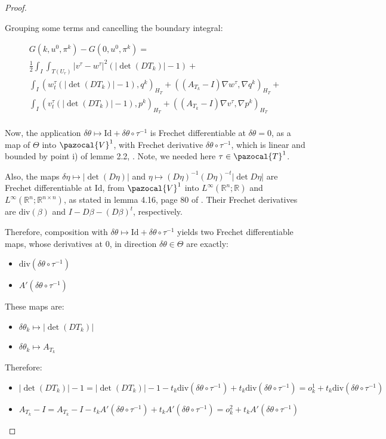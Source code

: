 \documentclass[english,a4paper,12pt,oneside]{scrbook}
\theoremstyle{break}
\newenvironment{mproof}[1][\proofname]{%
  \begin{proof}[#1]$ $\par\nobreak\ignorespaces
}{%
  \end{proof}
}
\renewcommand*{\proofname}{Proof}
\theoremstyle{remark}
\newcommand{\mR}{\mathbb{R}}
\newcommand{\cV}{\pazocal{V}}
\newcommand{\cT}{\pazocal{T}}
\newcommand{\id}{\text{Id}}
\newcommand{\te}{\theta}
\newcommand{\Te}{\Theta}
\newcommand{\dive}{\text{div}}
\begin{document}
\begin{mproof}
Grouping some terms and cancelling the boundary integral:

\begin{align*}
G(k,u^0,\pi^k)-G(0,u^0,\pi^k) =\\
\frac{1}{2}\int_I \int_{T(U_r)}|v^\tau-w^\tau|^2(|\det(DT_k)|-1)+\\
\int_I ( w_t^\tau (|\det(DT_k)| -1), q^k)_{H_T}+ ((A_{T_k}-I)\nabla w^\tau, \nabla q^k)_{H_T}+\\
\int_I (v_t^\tau (|\det(DT_k)|-1),p^k )_{H_T} + ((A_{T_k}-I) \nabla v^\tau, \nabla p^k)_{H_T} \\
\end{align*}

Now, the application $\delta \te \mapsto \id +\delta \te \circ \tau^{-1}$ is Frechet differentiable at $\delta \te =0$, as a map of $\Te$ into $\cV^1$, with Frechet derivative $\delta \te \circ \tau^{-1}$, which is linear and bounded by point i) of lemme 2.2, \cite{murat}. Note, we needed here $\tau \in \cT^1$.

Also, the maps $\delta \eta \mapsto |\det(D\eta)|$ and $\eta\mapsto (D\eta)^{-1}(D\eta)^{-t}|\det D\eta|$ are Frechet differentiable at $\id$, from $\cV^1$ into $L^\infty(\mR^n;\mR)$ and $L^\infty(\mR^n;\mR^{n\times n})$, as stated in lemma 4.16, page 80 of \cite{lindemann}. Their Frechet derivatives are $\dive (\beta)$ and $I-D\beta-(D\beta)^t$, respectively.

Therefore, composition with  $\delta \te  \mapsto \id+ \delta \te \circ \tau^{-1}$ yields two Frechet differentiable maps, whose derivatives at $0$, in direction $\delta \te \in \Te$ are exactly:

\begin{itemize}
	\item $\dive(\delta \te \circ \tau^{-1})$
	\item $A'(\delta \te \circ \tau^{-1})$
\end{itemize} 

These maps are:

\begin{itemize}
	\item $\delta \te_k \mapsto |\det(DT_k)|$
	\item $\delta \te_k \mapsto A_{T_k}$
\end{itemize}

Therefore:

\begin{itemize}
	\item $|\det(DT_k)|-1 = |\det(DT_k)|-1 - t_k\dive(\delta \te \circ \tau^{-1})+t_k\dive(\delta \te \circ \tau^{-1}) = o^1_k + t_k\dive(\delta \te \circ \tau^{-1})$
	\item $A_{T_k}-I = A_{T_k}-I - t_k A'(\delta \te \circ \tau^{-1}) + t_k A'(\delta \te \circ \tau^{-1}) = o_k^2 + t_k A'(\delta \te \circ \tau^{-1}) $
\end{itemize}


\end{mproof}
\end{document}
